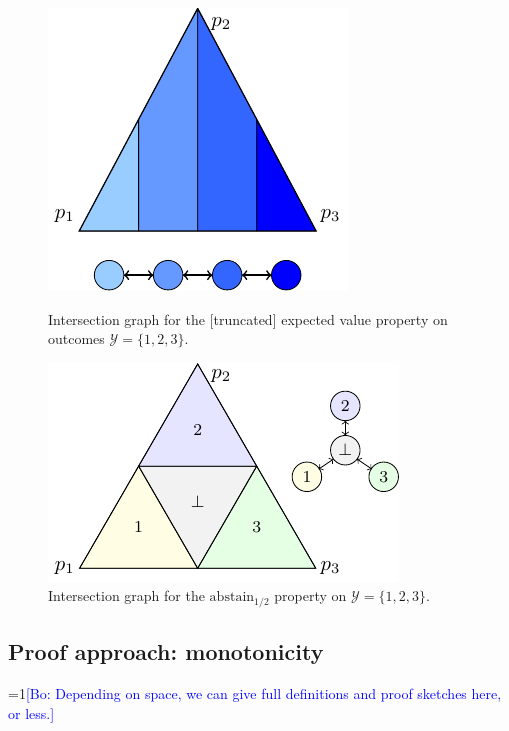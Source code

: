 \documentclass[anon]{colt2020} %
\newcommand{\Comments}{1}
\newcommand{\mynote}[2]{\ifnum\Comments=1\textcolor{#1}{#2}\fi}
\newcommand{\bo}[1]{\mynote{blue}{[Bo: #1]}}
\newcommand{\abstain}[1]{\mathrm{abstain}_{#1}}
\newcommand{\Y}{\mathcal{Y}}
\begin{document}
\begin{figure}\label{fig:intersection-graph}
	\begin{minipage}{0.48\linewidth}
	\centering
	\includegraphics[width = 0.8\linewidth]{tikz/intersection-graph.pdf}
	\caption{Intersection graph for the [truncated] expected value property on outcomes $\Y = \{1,2,3\}$.}
	\end{minipage}
\hfill
	\begin{minipage}{0.48\linewidth}
	\centering
	\includegraphics[width = 0.9\linewidth]{tikz/abstain-alpha-half.pdf}
	\caption{Intersection graph for the $\abstain{1/2}$ property on $\Y = \{1,2,3\}$.}
\end{minipage}
\end{figure}


\subsection{Proof approach: monotonicity}
\bo{Depending on space, we can give full definitions and proof sketches here, or less.}
\end{document}
